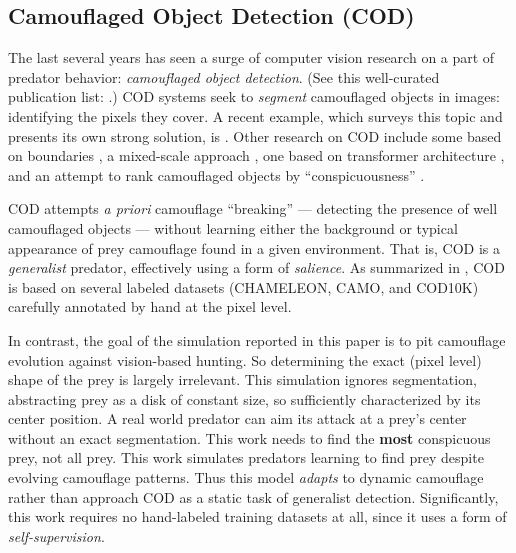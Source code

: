 \documentclass[letterpaper]{article}
\newcommand{\jargon}[1]{\textit{#1}}
\begin{document}
\subsection{Camouflaged Object Detection (COD)}
The last several years has seen a surge of computer vision research on a part of predator behavior: \jargon{camouflaged object detection}. (See this well-curated publication list: \citet{visionxiang_cod}.) COD systems seek to \jargon{segment} camouflaged objects in images: identifying the pixels they cover. A recent example, which surveys this topic and presents its own strong solution, is \citet{Zhang2022}. Other research on COD include some based on boundaries \cite{chen_boundary-guided_2022} \cite{sun_boundary-guided_2022}, a mixed-scale approach \cite{pang_zoom_2022}, one based on transformer architecture \cite{yin_camoformer_2022}, and an attempt to rank camouflaged objects by “conspicuousness” \cite{lv_cod_2022}.
\par
COD attempts \textit{a priori} camouflage “breaking” — detecting the presence of well camouflaged objects — without learning either the background or typical appearance of prey camouflage found in a given environment. That is, COD is a \jargon{generalist} predator, effectively using a form of \jargon{salience}. As summarized in \citet{Zhang2022}, COD is based on several labeled datasets (CHAMELEON, CAMO, and COD10K) carefully annotated by hand at the pixel level.
\par
In contrast, the goal of the simulation reported in this paper is to pit camouflage evolution against vision-based hunting. So determining the exact (pixel level) shape of the prey is largely irrelevant. This simulation ignores segmentation, abstracting prey as a disk of constant size, so sufficiently characterized by its center position. A real world predator can aim its attack at a prey's center without an exact segmentation. This work needs to find the \textbf{most} conspicuous prey, not all prey. This work simulates predators learning to find prey despite evolving camouflage patterns. Thus this model \jargon{adapts} to dynamic camouflage rather than approach COD as a static task of generalist detection. Significantly, this work requires no hand-labeled training datasets at all, since it uses a form of \jargon{self-supervision}.
\par

\end{document}
